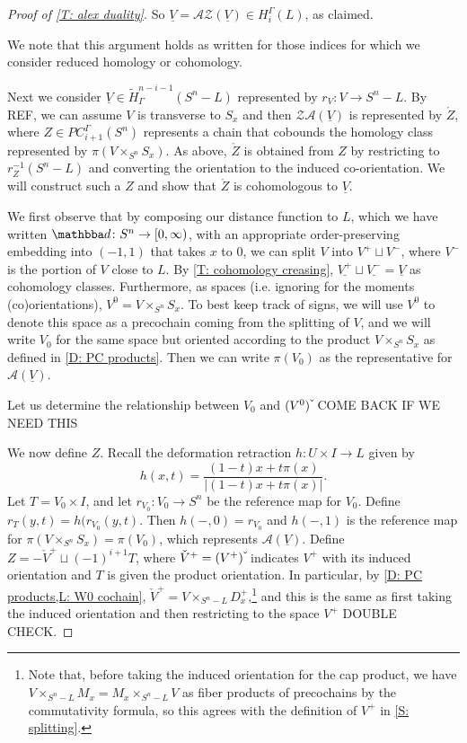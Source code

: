 \documentclass[12pt]{article}
\theoremstyle{plain}
\theoremstyle{definition}
\theoremstyle{remark}
\newcommand{\uV}{\underline{V}}
\newcommand{\td}[1]{\tilde{#1}}
\newcommand{\mc}[1]{\mathcal{#1}}
\begin{document}
\begin{proof}[Proof of \cref{T: alex duality}]
So $\uV = \mc A \mc Z(\uV) \in H_i^\Gamma(L)$, as claimed.

We note that this argument holds as written for those indices for which we consider reduced homology or cohomology.

Next we consider $\uV \in \td H^{n-i-1}_\Gamma(S^n-L)$ represented by $r_V \colon V \to S^n-L$.
By REF, we can assume $V$ is transverse to $S_x$ and then $\mc Z \mc A(\uV)$ is represented by $\mathring Z$, where $Z \in PC_{i+1}^\Gamma(S^n)$ represents a chain that cobounds the homology class represented by $\pi(V \times_{S^n} S_x)$.
As above, $\mathring Z$ is obtained from $Z$ by restricting to $r_Z^{-1}(S^n-L)$ and converting the orientation to the induced co-orientation.
We will construct such a $Z$ and show that $\mathring Z$ is cohomologous to $\uV$.

We first observe that by composing our distance function to $L$, which we have written $\mathbba d \colon S^n \to [0,\infty)$, with an appropriate order-preserving embedding into $(-1,1)$ that takes $x$ to $0$, we can split $V$ into $V^+ \sqcup V^-$, where $V^-$ is the portion of $V$ close to $L$.
By \cref{T: cohomology creasing}, $\underline{V^+} \sqcup \underline{V^-} = \uV$ as cohomology classes.
Furthermore, as spaces (i.e. ignoring for the moments (co)orientations), $V^0 = V \times_{S^n} S_x$.
To best keep track of signs, we will use $V^0$ to denote this space as a precochain coming from the splitting of $V$, and we will write $V_0$ for the same space but oriented according to the product $V \times_{S^n} S_x$ as defined in \cref{D: PC products}.
Then we can write $\pi(V_0)$ as the representative for $\mc A(\uV)$.

Let us determine the relationship between $V_0$ and $(V^0)\,\check{\vrule height1.3ex width0pt}$ COME BACK IF WE NEED THIS

We now define $Z$.
Recall the deformation retraction $h \colon U \times I \to L$ given by $$h(x,t) = \frac{(1-t)x + t\pi(x)}{|(1-t)x + t\pi(x) |}.$$
Let $T = V_0 \times I$, and let $r_{V_0} \colon V_0 \to S^n$ be the reference map for $V_0$.
Define $r_T(y,t) = h(r_{V_0}(y,t)$.
Then $h(-,0) = r_{V_0}$ and $h(-,1)$ is the reference map for $\pi(V \times_{S^n} S_x) = \pi(V_0)$, which represents $\mc A(\uV)$.
Define $Z = -\check V^+ \sqcup (-1)^{i+1} T$, where $\check V^+ = (V^+)\,\check{\vrule height1.3ex width0pt}$ indicates $V^+$ with its induced orientation and $T$ is given the product orientation.
In particular, by \cref{D: PC products,L: W0 cochain},  $\check V^+ = V \times_{S^n-L} D_x^+$,\footnote{Note that, before taking the induced orientation for the cap product, we have $V \times_{S^n-L} M_x = M_x \times_{S^n-L} V$ as fiber products of precochains by the commutativity formula, so this agrees with the definition of $V^+$ in \cref{S: splitting}.} and this is the same as first taking the induced orientation and then restricting to the space $V^+$ DOUBLE CHECK.


\end{proof}
\end{document}
